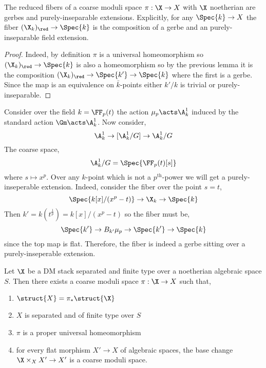 \documentclass[12pt]{article}
\begin{document}
\begin{lemma}
The reduced fibers of a coarse moduli space $\pi : \X \to X$ with $\X$ noetherian are gerbes and purely-inseparable extensions. Explicitly, for any $\Spec{k} \to X$ the fiber $(\X_k)_{\red} \to \Spec{k}$ is the composition of a gerbe and an purely-inseparable field extension.
\end{lemma}

\begin{proof}
Indeed, by definition $\pi$ is a universal homeomorphism so $(\X_k)_{\red} \to \Spec{k}$ is also a homeomorphism so by the previous lemma it is the composition $(\X_k)_{\red} \to \Spec{k'} \to \Spec{k}$ where the first is a gerbe. Since the map is an equivalence on $\bar{k}$-points either $k'/k$ is trivial or purely-inseparable. 
\end{proof}

\begin{example}
Consider over the field $k = \FF_p(t)$ the action $\mu_p \acts \A^1_k$ induced by the standard action $\Gm \acts \A^1_k$. Now consider,
\[ \A^1_k \to [\A^1_k / G] \to \A^1_k / G \]
The coarse space,
\[ \A^1_k / G = \Spec{\FF_p(t)[s]} \]
where $s \mapsto x^p$. Over any $k$-point which is not a $p^{\text{th}}$-power we will get a purely-inseperable extension. Indeed, consider the fiber over the point $s = t$,
\[ \Spec{k[x]/(x^p - t)} \to \X_k \to \Spec{k} \]
Then $k' = k(t^{\frac{1}{p}}) = k[x]/(x^p - t)$ so the fiber must be,
\[ \Spec{k'} \to B_{k'} \mu_p \to \Spec{k'} \to \Spec{k} \]
since the top map is flat. Therefore, the fiber is indeed a gerbe sitting over a purely-inseperable extension.
\end{example}

\begin{theorem}
Let $\X$ be a DM stack separated and finite type over a noetherian algebraic space $S$. Then there exists a coarse moduli space $\pi : \X \to X$ such that,
\begin{enumerate}
\item $\struct{X} = \pi_* \struct{\X}$

\item $X$ is separated and of finite type over $S$

\item $\pi$ is a proper universal homeomorphism

\item for every flat morphism $X' \to X$ of algebraic spaces, the base change $\X \times_X X' \to X'$ is a coarse moduli space.
\end{enumerate}
\end{theorem}
\end{document}
